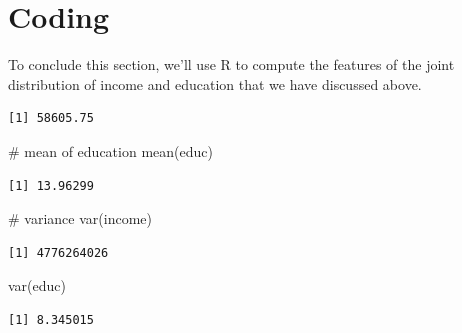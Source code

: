 \documentclass[
  letterpaper,
  DIV=11,
  numbers=noendperiod]{scrreprt}
\newenvironment{Shaded}{\begin{snugshade}}{\end{snugshade}}
\newcommand{\CommentTok}[1]{\textcolor[rgb]{0.37,0.37,0.37}{#1}}
\newcommand{\FunctionTok}[1]{\textcolor[rgb]{0.28,0.35,0.67}{#1}}
\newcommand{\NormalTok}[1]{\textcolor[rgb]{0.00,0.23,0.31}{#1}}
\newcommand{\OtherTok}[1]{\textcolor[rgb]{0.00,0.23,0.31}{#1}}
\newcommand{\SpecialCharTok}[1]{\textcolor[rgb]{0.37,0.37,0.37}{#1}}
\begin{document}
\section{Coding}\label{coding}

To conclude this section, we'll use R to compute the features of the
joint distribution of income and education that we have discussed above.

\begin{Shaded}
\end{Shaded}

\begin{verbatim}
[1] 58605.75
\end{verbatim}

\begin{Shaded}
\begin{Highlighting}[]
\CommentTok{\# mean of education}
\FunctionTok{mean}\NormalTok{(educ)}
\end{Highlighting}
\end{Shaded}

\begin{verbatim}
[1] 13.96299
\end{verbatim}

\begin{Shaded}
\begin{Highlighting}[]
\CommentTok{\# variance}
\FunctionTok{var}\NormalTok{(income)}
\end{Highlighting}
\end{Shaded}

\begin{verbatim}
[1] 4776264026
\end{verbatim}

\begin{Shaded}
\begin{Highlighting}[]
\FunctionTok{var}\NormalTok{(educ)}
\end{Highlighting}
\end{Shaded}

\begin{verbatim}
[1] 8.345015
\end{verbatim}
\end{document}
